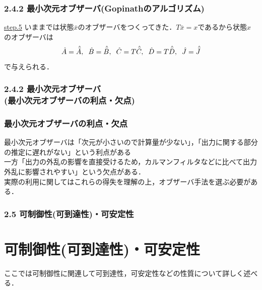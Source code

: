 \begin{frame}[t]
\frametitle{2.4.2 最小次元オブザーバ(Gopinathのアルゴリズム)}
\noindent \underline{step.5}
いままでは状態$\bar{x}$のオブザーバをつくってきた．$T \bar{x} = x$であるから状態$x$のオブザーバは
\begin{equation}
   \hat{A} = \hat{\bar{A}}
, \hspace{2mm}
   \hat{B} = \hat{\bar{B}}
, \hspace{2mm}
   \hat{C} = T \hat{\bar{C}}
, \hspace{2mm}
   \hat{D} = T \hat{\bar{D}}
, \hspace{2mm}
   \hat{J} = \hat{\bar{J}}
\end{equation}
で与えられる．
\end{frame}

\begin{frame}[t]
\frametitle{2.4.2 最小次元オブザーバ\\ (最小次元オブザーバの利点・欠点)}

\subsubsection{最小次元オブザーバの利点・欠点}

最小次元オブザーバは「次元が小さいので計算量が少ない」，「出力に関する部分の推定に遅れがない」という利点がある
\\[3mm]

一方「出力の外乱の影響を直接受けるため，カルマンフィルタなどに比べて出力外乱に影響されやすい」という欠点がある．\\[3mm]

実際の利用に関してはこれらの得失を理解の上，オブザーバ手法を選ぶ必要がある．

\end{frame}

\begin{frame}[t]
\frametitle{2.5 可制御性(可到達性)・可安定性}
\section{可制御性(可到達性)・可安定性}

ここでは可制御性に関連して可到達性，可安定性などの性質について詳しく述べる．


\end{frame}

